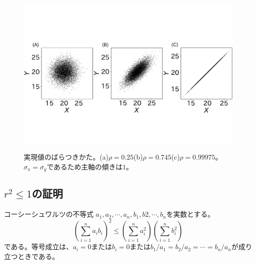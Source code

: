 \begin{figure}
 \begin{center}
  \includegraphics[width=12cm]{./image/16_/Correlation_variation_depends_covariance.pdf}
  \label{fig:Correlation_variation_depends_covariance}
  \caption{実現値のばらつきかた。(a)$\rho= 0.25$(b)$\rho=0.745$(c)$\rho=0.99975$。$\sigma_x=\sigma_y$であるため主軸の傾きは$1$。}
 \end{center}
\end{figure}

\subsection{$r^2\leq 1$の証明}
コーシーシュワルツの不等式
$a_1,a_2,\cdots,a_n,b_1,b2,\cdots,b_n$を実数とする。
\begin{equation*}
 (\sum_{i=1}^n a_i b_i)^2 \leq (\sum_{i=1}^n a_i^2)(\sum_{i=1}^n b_i^2)
\end{equation*}
である。等号成立は、$a_i=0$または$b_i=0$または$b_1/a_1=b_2/a_2=\cdots=b_n/a_n$が成り立つときである。

